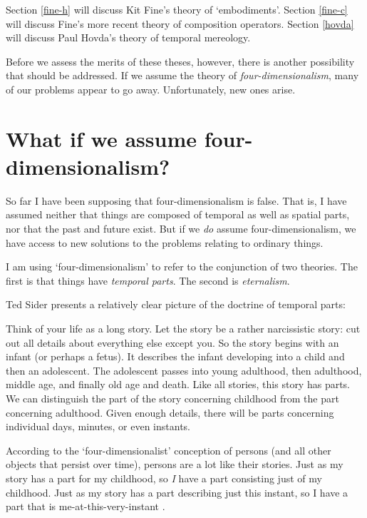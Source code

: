 \documentclass[11pt]{article}
\newenvironment{squote}{%
\begin{spacing}{1}
\begin{list}{}{%
\setlength{\labelwidth}{0pt}%
\rightmargin\leftmargin%
}
\item\relax
}{%
\end{list}%
\end{spacing}
}
\begin{document}
\begin{spacing}{1.5}
Section \ref{fine-h} will discuss Kit Fine's theory of `embodiments'.
Section \ref{fine-c} will discuss Fine's more recent theory of
composition operators.  Section \ref{hovda} will discuss Paul Hovda's
theory of temporal mereology.

Before we assess the merits of these theses, however, there is another
possibility that should be addressed.  If we assume the theory of {\em
  four-dimensionalism}, many of our problems appear to go away.
Unfortunately, new ones arise.

\section{What if we assume four-dimensionalism?}
\label{4d}
So far I have been supposing that four-dimensionalism is false.  That
is, I have assumed neither that things are composed of temporal as
well as spatial parts, nor that the past and future exist.  But if we
{\em do} assume four-dimensionalism, we have access to new solutions
to the problems relating to ordinary things.

I am using `four-dimensionalism' to refer to the conjunction of two
theories.  The first is that things have {\em temporal parts}.  The
second is {\em eternalism}.

Ted Sider presents a relatively clear picture of the doctrine of
temporal parts:

\begin{squote}
Think of your life as a long story.  Let the story be a rather
narcissistic story: cut out all details about everything else except
you.  So the story begins with an infant (or perhaps a fetus).  It
describes the infant developing into a child and then an adolescent.
The adolescent passes into young adulthood, then adulthood, middle
age, and finally old age and death.  Like all stories, this story has
parts.  We can distinguish the part of the story concerning childhood
from the part concerning adulthood.  Given enough details, there will
be parts concerning individual days, minutes, or even instants.

According to the `four-dimensionalist' conception of persons (and all
other objects that persist over time), persons are a lot like their
stories.  Just as my story has a part for my childhood, so {\em I}
have a part consisting just of my childhood.  Just as my story has a
part describing just this instant, so I have a part that is
me-at-this-very-instant \citeyearpar[1]{sider2001}.
\end{squote}


\end{spacing}
\end{document}
